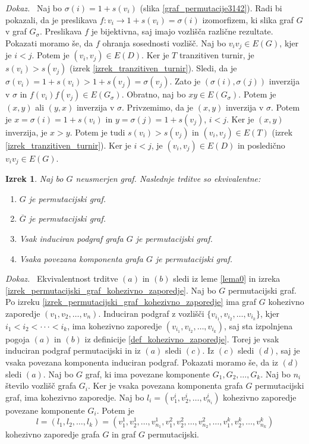 \documentclass[a4paper, 12pt]{book}
\newtheorem{izrek}{Izrek}[chapter]
\newenvironment{dokaz}{\emph{Dokaz.}\ }{\hspace{\fill}{$\Box$}}
\begin{document}
\begin{dokaz}
    Naj bo $\sigma(i) = 1 + s(v_i)$ (slika \ref{graf_permutacije3142}). Radi bi pokazali, da je preslikava $f: v_i \rightarrow 1 + s(v_i) = \sigma(i)$ izomorfizem, ki slika graf $G$ v graf $G_{\sigma}$. Preslikava $f$ je bijektivna, saj imajo vozlišča različne rezultate. Pokazati moramo še, da $f$ ohranja sosednosti vozlišč. Naj bo $v_iv_j \in E(G)$, kjer je $i < j$. Potem je $(v_i, v_j) \in E(D)$. Ker je $T$ tranzitiven turnir, je $s(v_i) > s(v_j)$ (izrek \ref{izrek_tranzitiven_turnir}). Sledi, da je $\sigma(v_i) = 1 + s(v_i) > 1 + s(v_j) = \sigma(v_j)$. Zato je $(\sigma(i), \sigma(j))$ inverzija v $\sigma$ in $f(v_i)f(v_j) \in E(G_{\sigma})$. Obratno, naj bo $xy \in E(G_{\sigma})$. Potem je $(x, y)$ ali $(y, x)$ inverzija v $\sigma$. Privzemimo, da je $(x, y)$ inverzija v $\sigma$. Potem je $x = \sigma(i) = 1 + s(v_i)$ in $y = \sigma(j) = 1 + s(v_j)$, $i < j$. Ker je $(x, y)$ inverzija, je $x > y$. Potem je tudi $s(v_i) > s(v_j)$ in $(v_i, v_j) \in E(T)$ (izrek \ref{izrek_tranzitiven_turnir}). Ker je $i < j$, je $(v_i, v_j) \in E(D)$ in posledično $v_iv_j \in E(G)$.
\end{dokaz}


\begin{izrek}
\label{izrek_ekvivalentne_trditve_permutacijski_graf}
    Naj bo $G$ neusmerjen graf. Naslednje trditve so ekvivalentne:
    \begin{enumerate}[label=(\alph*)]
        \item $G$ je permutacijski graf.
        \item $\overline{G}$ je permutacijski graf.
        \item Vsak induciran podgraf grafa $G$ je permutacijski graf.
        \item Vsaka povezana komponenta grafa $G$ je permutacijski graf.
    \end{enumerate}
\end{izrek}
\begin{dokaz}
    Ekvivalentnost trditve $(a)$ in $(b)$ sledi iz leme \ref{lema0} in izreka \ref{izrek_permutacijski_graf_kohezivno_zaporedje}. Naj bo $G$ permutacijski graf. Po izreku \ref{izrek_permutacijski_graf_kohezivno_zaporedje} ima graf $G$ kohezivno zaporedje $(v_1, v_2, \dots, v_n)$. Induciran podgraf z vozlišči $\{ v_{i_1}, v_{i_2}, \dots, v_{i_k} \}$, kjer $i_1 < i_2 < \cdot\cdot\cdot < i_k$, ima kohezivno zaporedje $(v_{i_1}, v_{i_2}, \dots, v_{i_k})$, saj sta izpolnjena pogoja $(a)$ in $(b)$ iz definicije \ref{def_kohezivno_zaporedje}. Torej je vsak induciran podgraf permutacijski in iz $(a)$ sledi $(c)$. Iz $(c)$ sledi $(d)$, saj je vsaka povezana komponenta induciran podgraf. Pokazati moramo še, da iz $(d)$ sledi $(a)$. Naj bo $G$ graf, ki ima povezane komponente $G_1, G_2, \dots, G_k$. Naj bo $n_i$ število vozlišč grafa $G_i$. Ker je vsaka povezana komponenta grafa $G$ permutacijski graf, ima kohezivno zaporedje. Naj bo $l_i = (v_1^i, v_2^i, \dots, v_{n_i}^i)$ kohezivno zaporedje povezane komponente $G_i$. Potem je 
    \[
        l = (l_1, l_2, \dots, l_k) = (v_1^1, v_2^1, \dots, v_{n_1}^1, v_1^2, v_2^2, \dots, v_{n_2}^2, \dots, v_1^k, v_2^k, \dots, v_{n_k}^k)
    \]
         kohezivno zaporedje grafa $G$ in graf $G$ permutacijski. 
\end{dokaz}
\end{document}

